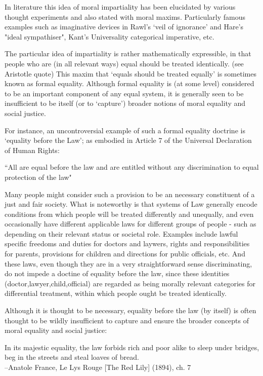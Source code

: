 \documentclass{article}
\begin{document}
In literature this idea of moral impartiality has been elucidated by various thought experiments and also stated with moral maxims.
Particularly famous examples such as imaginative devices in Rawl's `veil of ignorance' and Hare's "ideal sympathiser", Kant's Universality categorical imperative, etc.

The particular idea of impartiality is rather mathematically expressible, in that people who are (in all relevant ways) equal should be treated identically. (see Aristotle quote) This maxim that `equals should be treated equally' is sometimes known as formal equality.\cite{whatisbasicequalitynathan}
Although formal equality is (at some level) considered to be an important component of any equal system, it is generally seen to be insufficient to be itself (or to `capture') broader notions of moral equality and social justice.

For instance, an uncontroversial example of such a formal equality doctrine is `equality before the Law'; as embodied in Article 7 of the Universal Declaration of Human Rights: 
\begin{displayquote}
``All are equal before the law and are entitled without any discrimination to equal protection of the law"\cite{udhr}
\end{displayquote}
Many people might consider such a provision to be an necessary constituent of a just and fair society.
What is noteworthy is that systems of Law generally encode conditions from which people will be treated differently and unequally, and even occasionally have different applicable laws for different groups of people - such as depending on their relevant status or societal role.
Examples include lawful specific freedoms and duties for doctors and laywers, rights and responsibilities for parents, provisions for children and directions for public officials, etc.
And these laws, even though they are in a very straightforward sense discriminating, do not impede a doctine of equality before the law, since these identities (doctor,lawyer,child,official) are regarded as being morally relevant categories for differential treatment, within which people ought be treated identically.

Although it is thought to be necessary, equality before the law (by itself) is often thought to be wildly insufficient to capture and ensure the broader concepts of moral equality and social justice:
\begin{displayquote}
In its majestic equality, the law forbids rich and poor alike to sleep under bridges, beg in the streets and steal loaves of bread.\\
--Anatole France, Le Lys Rouge [The Red Lily] (1894), ch. 7
\end{displayquote}
\end{document}
